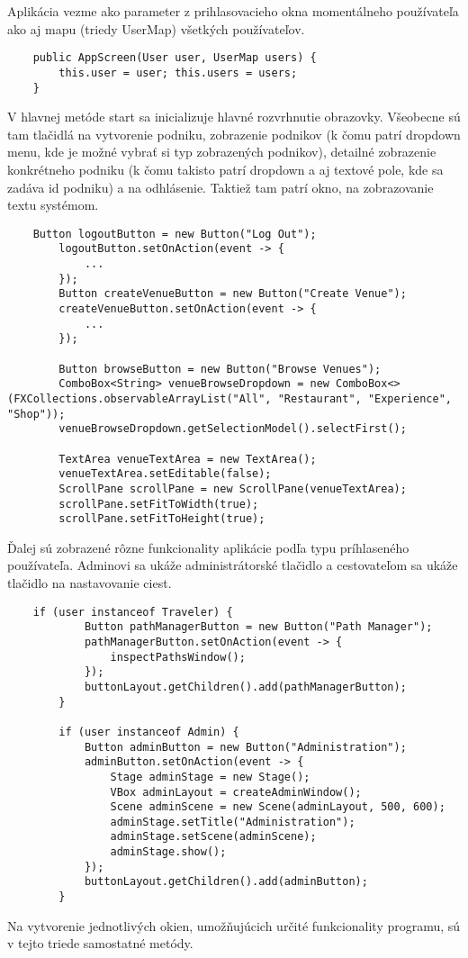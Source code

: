 \documentclass{article}
\begin{document}
Aplikácia vezme ako parameter z prihlasovacieho okna momentálneho používateľa ako aj mapu (triedy UserMap) všetkých používateľov.
\begin{verbatim}
    public AppScreen(User user, UserMap users) {
        this.user = user; this.users = users;
    }
\end{verbatim}
V hlavnej metóde start sa inicializuje hlavné rozvrhnutie obrazovky. Všeobecne sú tam tlačidlá na vytvorenie podniku, zobrazenie podnikov (k čomu patrí dropdown menu, kde je možné vybrať si typ zobrazených podnikov), detailné zobrazenie konkrétneho podniku (k čomu takisto patrí dropdown a aj textové pole, kde sa zadáva id podniku) a na odhlásenie. Taktiež tam patrí okno, na zobrazovanie textu systémom.
\begin{verbatim}
    Button logoutButton = new Button("Log Out");
        logoutButton.setOnAction(event -> {
            ...
        });
        Button createVenueButton = new Button("Create Venue");
        createVenueButton.setOnAction(event -> {
            ...
        });
        
        Button browseButton = new Button("Browse Venues");
        ComboBox<String> venueBrowseDropdown = new ComboBox<>(FXCollections.observableArrayList("All", "Restaurant", "Experience", "Shop"));
        venueBrowseDropdown.getSelectionModel().selectFirst();
        
        TextArea venueTextArea = new TextArea();
        venueTextArea.setEditable(false);
        ScrollPane scrollPane = new ScrollPane(venueTextArea);
        scrollPane.setFitToWidth(true);
        scrollPane.setFitToHeight(true);
\end{verbatim}
Ďalej sú zobrazené rôzne funkcionality aplikácie podľa typu príhlaseného používateľa. Adminovi sa ukáže administrátorské tlačidlo a cestovateľom sa ukáže tlačidlo na nastavovanie ciest.
\begin{verbatim}
    if (user instanceof Traveler) {
            Button pathManagerButton = new Button("Path Manager");
            pathManagerButton.setOnAction(event -> {
                inspectPathsWindow();
            });
            buttonLayout.getChildren().add(pathManagerButton);
        }

        if (user instanceof Admin) {
            Button adminButton = new Button("Administration");
            adminButton.setOnAction(event -> {
                Stage adminStage = new Stage();
                VBox adminLayout = createAdminWindow();
                Scene adminScene = new Scene(adminLayout, 500, 600);
                adminStage.setTitle("Administration");
                adminStage.setScene(adminScene);
                adminStage.show();
            });
            buttonLayout.getChildren().add(adminButton);
        }
\end{verbatim}
Na vytvorenie jednotlivých okien, umožňujúcich určité funkcionality programu, sú v tejto triede samostatné metódy.
\end{document}
